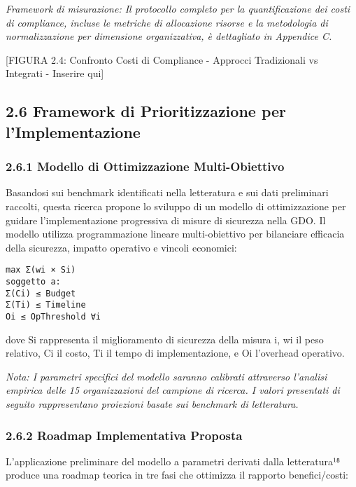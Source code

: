 \documentclass{report}
\begin{document}
\emph{Framework di misurazione: Il protocollo completo per la
quantificazione dei costi di compliance, incluse le metriche di
allocazione risorse e la metodologia di normalizzazione per dimensione
organizzativa, è dettagliato in Appendice C.}

{[}FIGURA 2.4: Confronto Costi di Compliance - Approcci Tradizionali vs
Integrati - Inserire qui{]}

\subsection{2.6 Framework di Prioritizzazione per
l'Implementazione}\label{framework-di-prioritizzazione-per-limplementazione}

\subsubsection{2.6.1 Modello di Ottimizzazione
Multi-Obiettivo}\label{modello-di-ottimizzazione-multi-obiettivo}

Basandosi sui benchmark identificati nella letteratura e sui dati
preliminari raccolti, questa ricerca propone lo sviluppo di un modello
di ottimizzazione per guidare l'implementazione progressiva di misure di
sicurezza nella GDO. Il modello utilizza programmazione lineare
multi-obiettivo per bilanciare efficacia della sicurezza, impatto
operativo e vincoli economici:

\begin{verbatim}
max Σ(wi × Si)
soggetto a:
Σ(Ci) ≤ Budget
Σ(Ti) ≤ Timeline
Oi ≤ OpThreshold ∀i
\end{verbatim}

dove Si rappresenta il miglioramento di sicurezza della misura i, wi il
peso relativo, Ci il costo, Ti il tempo di implementazione, e Oi
l'overhead operativo.

\emph{Nota: I parametri specifici del modello saranno calibrati
attraverso l'analisi empirica delle 15 organizzazioni del campione di
ricerca. I valori presentati di seguito rappresentano proiezioni basate
sui benchmark di letteratura.}

\subsubsection{2.6.2 Roadmap Implementativa
Proposta}\label{roadmap-implementativa-proposta}

L'applicazione preliminare del modello a parametri derivati dalla
letteratura¹⁸ produce una roadmap teorica in tre fasi che ottimizza il
rapporto benefici/costi:
\end{document}
